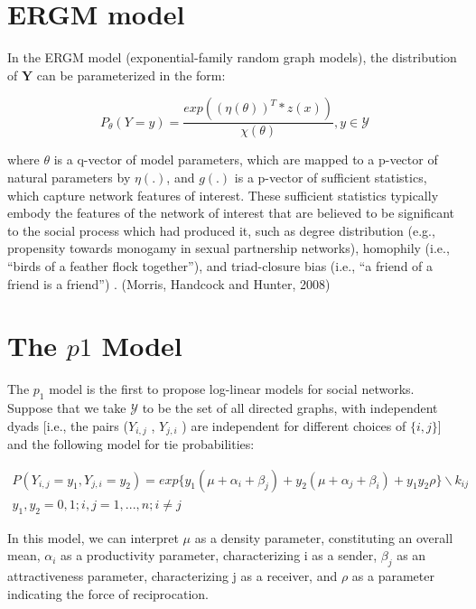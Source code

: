 \documentclass[12pt]{ociamthesis}  %
\begin{document}
	
	\section{ERGM model}
	In the ERGM model (exponential-family random graph models), the distribution of $\textbf{Y}$ can be parameterized in the form:
	
	\begingroup
	\large
	\begin{equation}
	P_{\theta}(Y = y) = \frac{exp((\eta(\theta)) ^{T}*z(x))}{\chi(\theta)}, y \in \mathcal{Y}
	\end{equation}
	\endgroup
	
	where $\theta$ is a q-vector of model parameters, which are mapped to a p-vector of natural parameters
	by $\eta(.)$, and $g(.)$ is a p-vector of sufficient statistics, which capture network features of interest. These sufficient statistics typically embody the
	features of the network of interest that are believed to be significant to the social
	process which had produced it, such as degree distribution (e.g., propensity
	towards monogamy in sexual partnership networks), homophily (i.e., “birds of
	a feather flock together”), and triad-closure bias (i.e., “a friend of a friend is a
	friend”) . (Morris, Handcock and Hunter, 2008)
	
	\section{The $p1$ Model}
	
	The $p_{1}$ model is the first to propose log-linear models for social
	networks. Suppose that we take $\mathcal{Y}$ to be the set of all directed graphs, with independent dyads [i.e., the pairs ($Y_{i,j}$ , $Y_{j,i}$ ) are independent for different choices of $\{i, j\}$] and the following model for tie probabilities:
	
	\begingroup
	\large
	\begin{multline}
	P(Y_{i,j} = y_{1}, Y_{j,i} = y_{2}) = exp \{ y_{1}(\mu + \alpha_{i} + \beta_{j}) + y_{2}(\mu + \alpha_{j} + \beta_{i}) + y_{1}y_{2} \rho\} \backslash k_{ij} \\  y_{1}, y_{2} = 0,1 ; i,j = 1,...,n; i \neq j 
	\end{multline}
	\endgroup
	
	In this model, we can interpret $\mu$ as a density parameter, constituting an overall mean, $\alpha_{i}$ as a productivity parameter, characterizing i as a sender, $\beta_{j}$ as an attractiveness parameter, characterizing j as a receiver, and $\rho$ as a parameter indicating the force of reciprocation.
	
\end{document}
